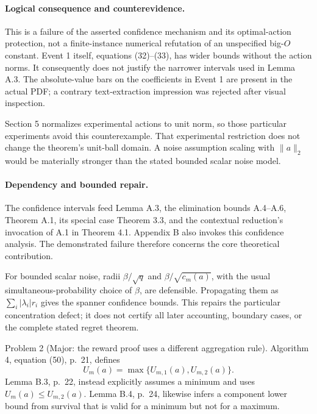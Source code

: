 \documentclass[10pt]{article}
\begin{document}
\paragraph*{Logical consequence and counterevidence.}\mbox{}\par
This is a failure of the asserted confidence mechanism and its optimal-action protection, not a finite-instance numerical refutation of an unspecified big-\(O\) constant. Event 1 itself, equations (32)–(33), has wider bounds without the action norms. It consequently does not justify the narrower intervals used in Lemma A.3. The absolute-value bars on the coefficients in Event 1 are present in the actual PDF; a contrary text-extraction impression was rejected after visual inspection.\par
Section 5 normalizes experimental actions to unit norm, so those particular experiments avoid this counterexample. That experimental restriction does not change the theorem’s unit-ball domain. A noise assumption scaling with \(\|a\|_2\) would be materially stronger than the stated bounded scalar noise model.\par
\paragraph*{Dependency and bounded repair.}\mbox{}\par
The confidence intervals feed Lemma A.3, the elimination bounds A.4–A.6, Theorem A.1, its special case Theorem 3.3, and the contextual reduction’s invocation of A.1 in Theorem 4.1. Appendix B also invokes this confidence analysis. The demonstrated failure therefore concerns the core theoretical contribution.\par
For bounded scalar noise, radii \(\beta/\sqrt q\) and \(\beta/\sqrt{c_m(a)}\), with the usual simultaneous-probability choice of \(\beta\), are defensible. Propagating them as \(\sum_i|\lambda_i|r_i\) gives the spanner confidence bounds. This repairs the particular concentration defect; it does not certify all later accounting, boundary cases, or the complete stated regret theorem.\par
Problem 2 (Major: the reward proof uses a different aggregation rule).  Algorithm 4, equation (50), p. 21, defines \[U_m(a)=\max\{U_{m,1}(a),U_{m,2}(a)\}.\] Lemma B.3, p. 22, instead explicitly assumes a minimum and uses \(U_m(a)\leq U_{m,2}(a)\). Lemma B.4, p. 24, likewise infers a component lower bound from survival that is valid for a minimum but not for a maximum.\par
\end{document}
